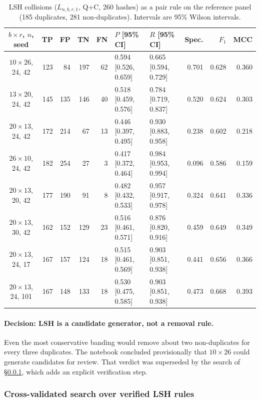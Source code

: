 \begin{table}[t]
\centering
\small
\setlength{\tabcolsep}{4pt}
\begin{tabular}{@{}crrrrllrrr@{}}
\toprule
$b{\times}r$, $n$, seed & TP & FP & TN & FN & $P$ [95\% CI] & $R$ [95\% CI] & Spec. & $F_1$ & MCC \\
\midrule
$10{\times}26$, 24, 42 & 123 & 84 & 197 & 62 & 0.594 [0.526, 0.659] & 0.665 [0.594, 0.729] & 0.701 & 0.628 & 0.360 \\
$13{\times}20$, 24, 42 & 145 & 135 & 146 & 40 & 0.518 [0.459, 0.576] & 0.784 [0.719, 0.837] & 0.520 & 0.624 & 0.303 \\
$20{\times}13$, 24, 42 & 172 & 214 & 67 & 13 & 0.446 [0.397, 0.495] & 0.930 [0.883, 0.958] & 0.238 & 0.602 & 0.218 \\
$26{\times}10$, 24, 42 & 182 & 254 & 27 & 3 & 0.417 [0.372, 0.464] & 0.984 [0.953, 0.994] & 0.096 & 0.586 & 0.159 \\
\midrule
$20{\times}13$, 20, 42 & 177 & 190 & 91 & 8 & 0.482 [0.432, 0.533] & 0.957 [0.917, 0.978] & 0.324 & 0.641 & 0.336 \\
$20{\times}13$, 30, 42 & 162 & 152 & 129 & 23 & 0.516 [0.461, 0.571] & 0.876 [0.820, 0.916] & 0.459 & 0.649 & 0.349 \\
$20{\times}13$, 24, 17 & 167 & 157 & 124 & 18 & 0.515 [0.461, 0.569] & 0.903 [0.851, 0.938] & 0.441 & 0.656 & 0.366 \\
$20{\times}13$, 24, 101 & 167 & 148 & 133 & 18 & 0.530 [0.475, 0.585] & 0.903 [0.851, 0.938] & 0.473 & 0.668 & 0.393 \\
\bottomrule
\end{tabular}
\caption{LSH collisions ($L_{n,b,r,1}$, Q+C, 260 hashes) as a pair rule on
the reference panel (185 duplicates, 281 non-duplicates). Intervals are 95\%
Wilson intervals.}
\label{tab:dedup-pairwise}
\end{table}

\paragraph{Decision: LSH is a candidate generator, not a removal rule.} Even
the most conservative banding would remove about two non-duplicates for every
three duplicates. The notebook concluded provisionally that $10{\times}26$
could generate candidates for review. That verdict was superseded by the
search of \S\ref{app:dedup-fuzzy-search}, which adds an explicit
verification step.

\subsubsection{Cross-validated search over verified LSH rules}
\label{app:dedup-fuzzy-search}

